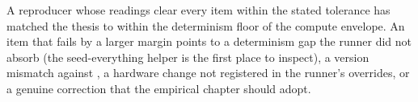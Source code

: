 A reproducer whose readings clear every item within the stated tolerance has matched the thesis to within the determinism floor of the compute envelope. An item that fails by a larger margin points to a determinism gap the runner did not absorb (the seed-everything helper is the first place to inspect), a version mismatch against , a hardware change not registered in the runner's overrides, or a genuine correction that the empirical chapter should adopt.
